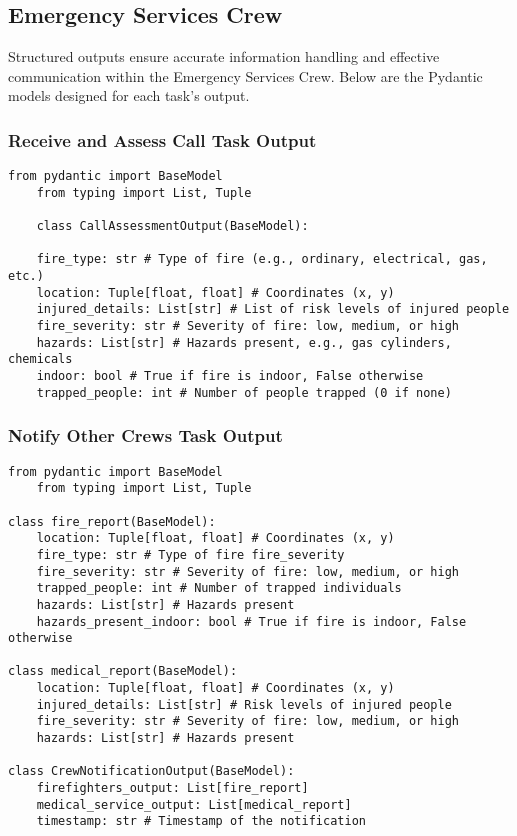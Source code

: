 \subsection{Emergency Services Crew}

Structured outputs ensure accurate information handling and effective communication within the Emergency Services Crew. Below 
are the Pydantic models designed for each task's output.

\subsubsection{Receive and Assess Call Task Output}

\begin{lstlisting}[caption={Pydantic model for Receive and Assess Call Task Output}] 
    from pydantic import BaseModel
    from typing import List, Tuple

    class CallAssessmentOutput(BaseModel): 

    fire_type: str # Type of fire (e.g., ordinary, electrical, gas, etc.) 
    location: Tuple[float, float] # Coordinates (x, y) 
    injured_details: List[str] # List of risk levels of injured people 
    fire_severity: str # Severity of fire: low, medium, or high 
    hazards: List[str] # Hazards present, e.g., gas cylinders, chemicals 
    indoor: bool # True if fire is indoor, False otherwise 
    trapped_people: int # Number of people trapped (0 if none) \end{lstlisting}

\subsubsection{Notify Other Crews Task Output}

\begin{lstlisting}[caption={Pydantic model for Notify Other Crews Task Output}] 
    from pydantic import BaseModel 
    from typing import List, Tuple

class fire_report(BaseModel): 
    location: Tuple[float, float] # Coordinates (x, y) 
    fire_type: str # Type of fire fire_severity
    fire_severity: str # Severity of fire: low, medium, or high
    trapped_people: int # Number of trapped individuals 
    hazards: List[str] # Hazards present
    hazards_present_indoor: bool # True if fire is indoor, False otherwise

class medical_report(BaseModel): 
    location: Tuple[float, float] # Coordinates (x, y) 
    injured_details: List[str] # Risk levels of injured people 
    fire_severity: str # Severity of fire: low, medium, or high 
    hazards: List[str] # Hazards present

class CrewNotificationOutput(BaseModel): 
    firefighters_output: List[fire_report]
    medical_service_output: List[medical_report]
    timestamp: str # Timestamp of the notification \end{lstlisting}

